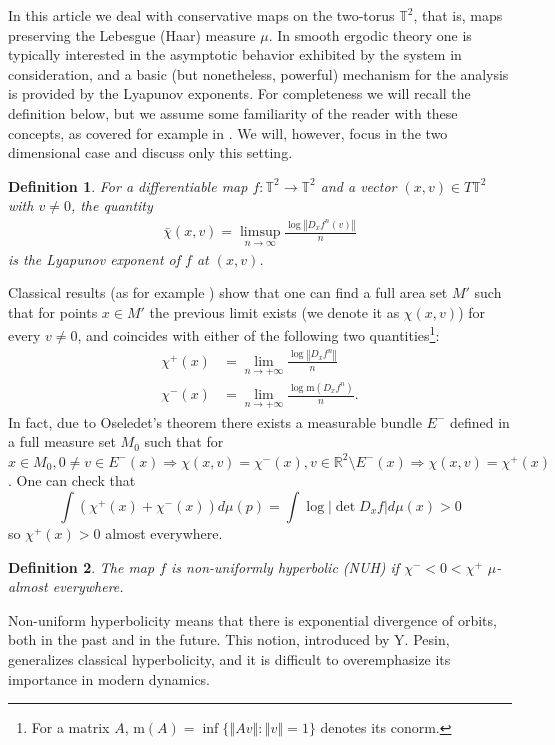 \documentclass[11pt,letterpaper,reqno]{article}
\newtheorem{definition}{Definition}[section]
\newcommand{\norm}[1]{\left\Vert#1\right\Vert}
\newcommand{\conorm}[1]{\mathrm{m}\left(#1\right)}
\newcommand{\Tor}{\mathbb{T}^2}
\newcommand{\RR}{\mathbb{R}^2}
\begin{document}
In this article we deal with conservative maps on the two-torus $\Tor$, that is, maps preserving the Lebesgue (Haar) measure $\mu$. In smooth ergodic theory one is typically interested in the asymptotic behavior exhibited by the system in consideration, and a basic (but nonetheless, powerful) mechanism for the analysis is provided by the Lyapunov exponents. For completeness we will recall the definition below, but we assume some familiarity of the reader with these concepts, as covered for example in \cite{Barreira2013}. We will, however, focus in the two dimensional case and discuss only this setting.

\begin{definition}
For a differentiable map $f:\Tor\to\Tor$ and a vector $(x,v)\in T\Tor$ with $v\neq 0$, the quantity
\begin{align*}
\bar{\chi}(x,v)=\limsup_{n\to\infty}\frac{\log\norm{D_xf^n(v)}}{n}
\end{align*}
is the Lyapunov exponent of $f$ at $(x,v)$.
\end{definition}
Classical results (as for example \cite{FurstKest60}) show that one can find a full area set $M'$ such that for points $x\in M'$ the previous limit exists (we denote it as $\chi(x,v)$) for every $v\neq 0$, and coincides with either of the following two quantities\footnote{For a matrix $A$, $\conorm{A}=\inf\{\norm{Av}:\norm{v}=1\}$ denotes its conorm.}:
\begin{align*}
\chi^+(x)&=\lim_{n\to+\infty}\frac{\log\norm{D_xf^n}}{n}\\
\chi^-(x)&=\lim_{n\to+\infty}\frac{\log\conorm{D_xf^n}}{n}.
\end{align*}
In fact, due to Oseledet's theorem \cite{Oseledets} there exists a measurable bundle $E^-$ defined in a full measure set $M_0$ such that for $x\in M_0, 0\neq v\in E^{-}(x)\Rightarrow \chi(x,v)=\chi^{-}(x), v\in \RR\setminus E^{-}(x)\Rightarrow \chi(x,v)=\chi^{+}(x)$. One can check that
\[
	\int (\chi^{+}(x)+\chi^{-}(x)) d\mu(p)=\int \log |\det D_xf| d\mu(x)>0
\]
so $\chi^{+}(x)>0$ almost everywhere.


\begin{definition}
The map $f$ is non-uniformly hyperbolic (NUH) if $\chi^-<0<\chi^+$ $\mu$-almost everywhere.
\end{definition}



Non-uniform hyperbolicity means that there is exponential divergence of orbits, both in the past and in the future. This notion, introduced by Y. Pesin, generalizes classical hyperbolicity, and it is difficult to overemphasize its importance in modern dynamics. 
\end{document}
